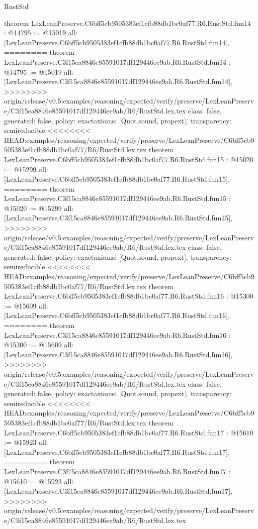 \begin{lexlean}{RustStd}
\begin{coremodule}
{\begin{coremodule}
{{{{{{{{{{{{{{{{theorem LexLeanPreserve.C6bff5cb9505383ef1cfb88db1bc0af77.R6.RustStd.fun14 : @14795 := @15019 {
  all: [LexLeanPreserve.C6bff5cb9505383ef1cfb88db1bc0af77.R6.RustStd.fun14],
========
theorem LexLeanPreserve.C3f15ca8846e85591017df129446ee9ab.R6.RustStd.fun14 : @14795 := @15019 {
  all: [LexLeanPreserve.C3f15ca8846e85591017df129446ee9ab.R6.RustStd.fun14],
>>>>>>>> origin/release/v0.5:examples/reasoning/expected/verify/preserve/LexLeanPreserve/C3f15ca8846e85591017df129446ee9ab/R6/RustStd.lex.tex
  class: false,
  generated: false,
  policy: exact{axioms: [Quot.sound, propext]},
  transparency: semireducible
}
<<<<<<<< HEAD:examples/reasoning/expected/verify/preserve/LexLeanPreserve/C6bff5cb9505383ef1cfb88db1bc0af77/R6/RustStd.lex.tex
theorem LexLeanPreserve.C6bff5cb9505383ef1cfb88db1bc0af77.R6.RustStd.fun15 : @15020 := @15299 {
  all: [LexLeanPreserve.C6bff5cb9505383ef1cfb88db1bc0af77.R6.RustStd.fun15],
========
theorem LexLeanPreserve.C3f15ca8846e85591017df129446ee9ab.R6.RustStd.fun15 : @15020 := @15299 {
  all: [LexLeanPreserve.C3f15ca8846e85591017df129446ee9ab.R6.RustStd.fun15],
>>>>>>>> origin/release/v0.5:examples/reasoning/expected/verify/preserve/LexLeanPreserve/C3f15ca8846e85591017df129446ee9ab/R6/RustStd.lex.tex
  class: false,
  generated: false,
  policy: exact{axioms: [Quot.sound, propext]},
  transparency: semireducible
}
<<<<<<<< HEAD:examples/reasoning/expected/verify/preserve/LexLeanPreserve/C6bff5cb9505383ef1cfb88db1bc0af77/R6/RustStd.lex.tex
theorem LexLeanPreserve.C6bff5cb9505383ef1cfb88db1bc0af77.R6.RustStd.fun16 : @15300 := @15609 {
  all: [LexLeanPreserve.C6bff5cb9505383ef1cfb88db1bc0af77.R6.RustStd.fun16],
========
theorem LexLeanPreserve.C3f15ca8846e85591017df129446ee9ab.R6.RustStd.fun16 : @15300 := @15609 {
  all: [LexLeanPreserve.C3f15ca8846e85591017df129446ee9ab.R6.RustStd.fun16],
>>>>>>>> origin/release/v0.5:examples/reasoning/expected/verify/preserve/LexLeanPreserve/C3f15ca8846e85591017df129446ee9ab/R6/RustStd.lex.tex
  class: false,
  generated: false,
  policy: exact{axioms: [Quot.sound, propext]},
  transparency: semireducible
}
<<<<<<<< HEAD:examples/reasoning/expected/verify/preserve/LexLeanPreserve/C6bff5cb9505383ef1cfb88db1bc0af77/R6/RustStd.lex.tex
theorem LexLeanPreserve.C6bff5cb9505383ef1cfb88db1bc0af77.R6.RustStd.fun17 : @15610 := @15923 {
  all: [LexLeanPreserve.C6bff5cb9505383ef1cfb88db1bc0af77.R6.RustStd.fun17],
========
theorem LexLeanPreserve.C3f15ca8846e85591017df129446ee9ab.R6.RustStd.fun17 : @15610 := @15923 {
  all: [LexLeanPreserve.C3f15ca8846e85591017df129446ee9ab.R6.RustStd.fun17],
>>>>>>>> origin/release/v0.5:examples/reasoning/expected/verify/preserve/LexLeanPreserve/C3f15ca8846e85591017df129446ee9ab/R6/RustStd.lex.tex
}}}}}}}}}}}}}}}}}}}}}
\end{coremodule}}
\end{coremodule}
\end{lexlean}
